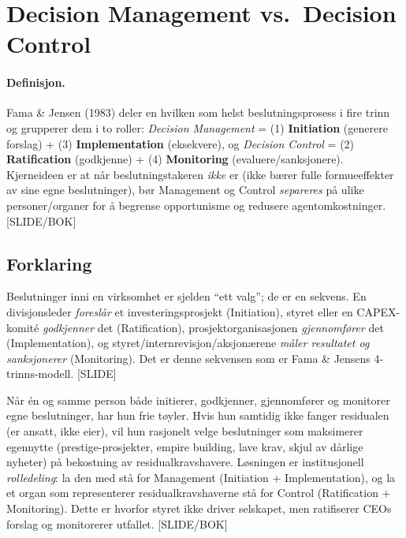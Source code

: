 \section{Decision Management vs.\ Decision Control}\label{thr:decision-management-control}

\paragraph{Definisjon.} Fama \& Jensen (1983) deler en hvilken som helst beslutningsprosess i fire trinn og grupperer dem i to roller: \emph{Decision Management} = (1) \textbf{Initiation} (generere forslag) + (3) \textbf{Implementation} (eksekvere), og \emph{Decision Control} = (2) \textbf{Ratification} (godkjenne) + (4) \textbf{Monitoring} (evaluere/sanksjonere). Kjerneideen er at når beslutningstakeren \emph{ikke} er  (ikke bærer fulle formueeffekter av sine egne beslutninger), bør Management og Control \emph{separeres} på ulike personer/organer for å begrense opportunisme og redusere agentomkostninger. [SLIDE/BOK]

\subsection*{Forklaring}

Beslutninger inni en virksomhet er sjelden ``ett valg''; de er en sekvens. En divisjonsleder \emph{foreslår} et investeringsprosjekt (Initiation), styret eller en CAPEX-komité \emph{godkjenner} det (Ratification), prosjektorganisasjonen \emph{gjennomfører} det (Implementation), og styret/internrevisjon/aksjonærene \emph{måler resultatet og sanksjonerer} (Monitoring). Det er denne sekvensen som er Fama \& Jensens 4-trinns-modell. [SLIDE]

Når én og samme person både initierer, godkjenner, gjennomfører og monitorer egne beslutninger, har hun frie tøyler. Hvis hun samtidig ikke fanger residualen (er ansatt, ikke eier), vil hun rasjonelt velge beslutninger som maksimerer egennytte (prestige-prosjekter, empire building, lave krav, skjul av dårlige nyheter) på bekostning av residualkravshavere. Løsningen er institusjonell \emph{rolledeling}: la den med  stå for Management (Initiation + Implementation), og la et organ som representerer residualkravshaverne stå for Control (Ratification + Monitoring). Dette er hvorfor styret ikke driver selskapet, men ratifiserer CEOs forslag og monitorerer utfallet. [SLIDE/BOK]

